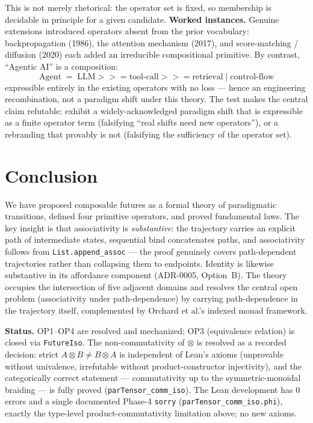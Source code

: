\documentclass[11pt,a4paper]{article}
\newcommand{\seqBind}{\mathbin{>>=}}
\newcommand{\fork}{\mathbin{|}}
\begin{document}
This is not merely rhetorical: the operator set is fixed, so membership is
decidable in principle for a given candidate. \textbf{Worked instances.} Genuine
extensions introduced operators absent from the prior vocabulary:
backpropagation (1986), the attention mechanism (2017), and score-matching /
diffusion (2020) each added an irreducible compositional primitive. By
contrast, ``Agentic AI'' is a composition:
\[
\text{Agent} \;=\; \text{LLM} \seqBind \text{tool-call} \seqBind
\text{retrieval} \fork \text{control-flow}
\]
expressible entirely in the existing operators with no loss --- hence an
engineering recombination, not a paradigm shift under this theory. The test
makes the central claim refutable: exhibit a widely-acknowledged paradigm
shift that is expressible as a finite operator term (falsifying ``real shifts
need new operators''), or a rebranding that provably is not (falsifying the
sufficiency of the operator set).

\section{Conclusion}

We have proposed composable futures as a formal theory of paradigmatic
transitions, defined four primitive operators, and proved fundamental laws.
The key insight is that associativity is \emph{substantive}: the trajectory
carries an explicit path of intermediate states, sequential bind concatenates
paths, and associativity follows from \texttt{List.append\_assoc} --- the proof
genuinely covers path-dependent trajectories rather than collapsing them to
endpoints. Identity is likewise substantive in its affordance component
(ADR-0005, Option~B). The theory occupies the intersection of five adjacent
domains and resolves the central open problem (associativity under
path-dependence) by carrying path-dependence in the trajectory itself,
complemented by Orchard et al.'s indexed monad framework.

\textbf{Status.} OP1--OP4 are resolved and mechanized; OP3 (equivalence
relation) is closed via \texttt{FutureIso}. The non-commutativity of $\otimes$
is resolved as a recorded decision: strict $A \otimes B \neq B \otimes A$ is
independent of Lean's axioms (unprovable without univalence, irrefutable
without product-constructor injectivity), and the categorically correct
statement --- commutativity up to the symmetric-monoidal braiding --- is fully
proved (\texttt{parTensor\_comm\_iso}). The Lean development has 0 errors and a
single documented Phase-4 \texttt{sorry} (\texttt{parTensor\_comm\_iso.phi}),
exactly the type-level product-commutativity limitation above; no new axioms.
\end{document}
